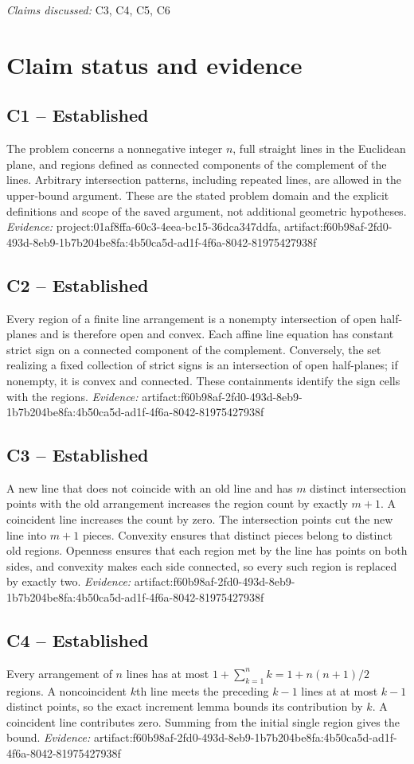 \documentclass[11pt]{article}
\begin{document}
\textit{Claims discussed: }C3, C4, C5, C6
\section*{Claim status and evidence}
\subsection{C1 -- Established}
The problem concerns a nonnegative integer $n$, full straight lines in the Euclidean plane, and regions defined as connected components of the complement of the lines. Arbitrary intersection patterns, including repeated lines, are allowed in the upper-bound argument.
These are the stated problem domain and the explicit definitions and scope of the saved argument, not additional geometric hypotheses.
\textit{Evidence: }project:01af8ffa-60c3-4eea-bc15-36dca347ddfa, artifact:f60b98af-2fd0-493d-8eb9-1b7b204be8fa:4b50ca5d-ad1f-4f6a-8042-81975427938f
\subsection{C2 -- Established}
Every region of a finite line arrangement is a nonempty intersection of open half-planes and is therefore open and convex.
Each affine line equation has constant strict sign on a connected component of the complement. Conversely, the set realizing a fixed collection of strict signs is an intersection of open half-planes; if nonempty, it is convex and connected. These containments identify the sign cells with the regions.
\textit{Evidence: }artifact:f60b98af-2fd0-493d-8eb9-1b7b204be8fa:4b50ca5d-ad1f-4f6a-8042-81975427938f
\subsection{C3 -- Established}
A new line that does not coincide with an old line and has $m$ distinct intersection points with the old arrangement increases the region count by exactly $m+1$. A coincident line increases the count by zero.
The intersection points cut the new line into $m+1$ pieces. Convexity ensures that distinct pieces belong to distinct old regions. Openness ensures that each region met by the line has points on both sides, and convexity makes each side connected, so every such region is replaced by exactly two.
\textit{Evidence: }artifact:f60b98af-2fd0-493d-8eb9-1b7b204be8fa:4b50ca5d-ad1f-4f6a-8042-81975427938f
\subsection{C4 -- Established}
Every arrangement of $n$ lines has at most $1+\sum_{k=1}^{n}k=1+n(n+1)/2$ regions.
A noncoincident $k$th line meets the preceding $k-1$ lines at at most $k-1$ distinct points, so the exact increment lemma bounds its contribution by $k$. A coincident line contributes zero. Summing from the initial single region gives the bound.
\textit{Evidence: }artifact:f60b98af-2fd0-493d-8eb9-1b7b204be8fa:4b50ca5d-ad1f-4f6a-8042-81975427938f
\end{document}
